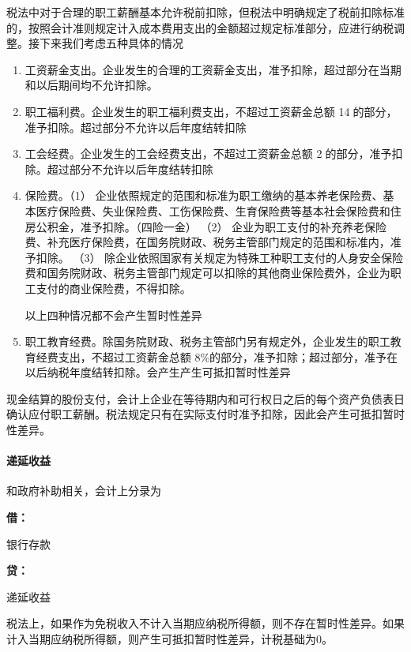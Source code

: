 \documentclass[UTF8,12pt]{ctexart}
\newenvironment{Dr}{%
	\begin{list}{}%
		{
			\setlength{\leftmargin}{2em}
			\setlength{\labelwidth}{2em}
			\setlength{\labelsep}{0pt}
			\setlength{\itemindent}{0pt}
			\setlength{\listparindent}{0pt}
			\setlength{\parsep}{0pt}
			\setlength{\topsep}{0pt}
		}
		\item[\textbf{借：}]
	}{%
	\end{list}
}
\newenvironment{Cr}{%
	\begin{list}{}%
		{
			\setlength{\leftmargin}{2em}
			\setlength{\labelwidth}{2em}
			\setlength{\labelsep}{0pt}
			\setlength{\itemindent}{0pt}
			\setlength{\listparindent}{0pt}
			\setlength{\parsep}{0pt}
			\setlength{\topsep}{0pt}
		}
		\item[\textbf{贷：}]
	}{%
	\end{list}
}
\numberwithin{equation}{section} %
\numberwithin{figure}{section}
\numberwithin{table}{section}
\begin{document}
	税法中对于合理的职工薪酬基本允许税前扣除，但税法中明确规定了税前扣除标准的，按照会计准则规定计入成本费用支出的金额超过规定标准部分，应进行纳税调整。接下来我们考虑五种具体的情况
	\begin{enumerate}
		\item 工资薪金支出。企业发生的合理的工资薪金支出，准予扣除，超过部分在当期和以后期间均不允许扣除。
		
		\item 职工福利费。企业发生的职工福利费支出，不超过工资薪金总额 14的部分，准予扣除。超过部分不允许以后年度结转扣除
		
		\item 工会经费。企业发生的工会经费支出，不超过工资薪金总额 2的部分，准予扣除。超过部分不允许以后年度结转扣除
		
		\item 保险费。（1）	企业依照规定的范围和标准为职工缴纳的基本养老保险费、基本医疗保险费、失业保险费、工伤保险费、生育保险费等基本社会保险费和住房公积金，准予扣除。（四险一金）
		（2）	企业为职工支付的补充养老保险费、补充医疗保险费，在国务院财政、税务主管部门规定的范围和标准内，准予扣除。
		（3）	除企业依照国家有关规定为特殊工种职工支付的人身安全保险费和国务院财政、税务主管部门规定可以扣除的其他商业保险费外，企业为职工支付的商业保险费，不得扣除。
		
		以上四种情况都不会产生暂时性差异
		
		\item 职工教育经费。除国务院财政、税务主管部门另有规定外，企业发生的职工教育经费支出，不超过工资薪金总额 8\%的部分，准予扣除；超过部分，准予在以后纳税年度结转扣除。会产生产生可抵扣暂时性差异
	\end{enumerate}
	
	现金结算的股份支付，会计上企业在等待期内和可行权日之后的每个资产负债表日确认应付职工薪酬。税法规定只有在实际支付时准予扣除，因此会产生可抵扣暂时性差异。
	
	\paragraph{递延收益}
	和政府补助相关，会计上分录为
	\begin{Dr}
		银行存款
	\end{Dr}
	\begin{Cr}
		递延收益
	\end{Cr}
	
	税法上，如果作为免税收入不计入当期应纳税所得额，则不存在暂时性差异。如果计入当期应纳税所得额，则产生可抵扣暂时性差异，计税基础为0。
	
\end{document}
